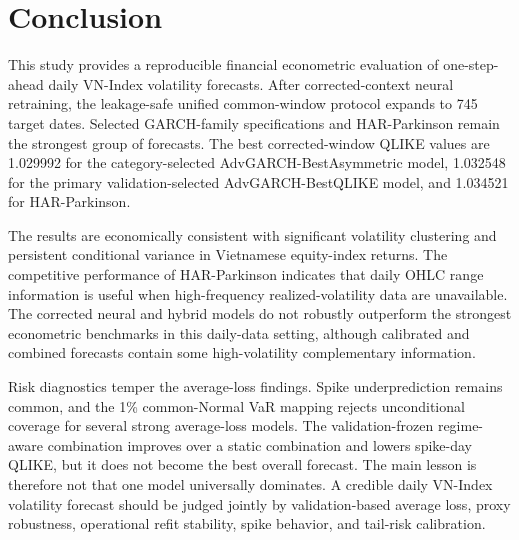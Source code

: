 \section{Conclusion}

This study provides a reproducible financial econometric evaluation of one-step-ahead daily VN-Index volatility forecasts. After corrected-context neural retraining, the leakage-safe unified common-window protocol expands to 745 target dates. Selected GARCH-family specifications and HAR-Parkinson remain the strongest group of forecasts. The best corrected-window QLIKE values are 1.029992 for the category-selected AdvGARCH-BestAsymmetric model, 1.032548 for the primary validation-selected AdvGARCH-BestQLIKE model, and 1.034521 for HAR-Parkinson.

The results are economically consistent with significant volatility clustering and persistent conditional variance in Vietnamese equity-index returns. The competitive performance of HAR-Parkinson indicates that daily OHLC range information is useful when high-frequency realized-volatility data are unavailable. The corrected neural and hybrid models do not robustly outperform the strongest econometric benchmarks in this daily-data setting, although calibrated and combined forecasts contain some high-volatility complementary information.

Risk diagnostics temper the average-loss findings. Spike underprediction remains common, and the 1\% common-Normal VaR mapping rejects unconditional coverage for several strong average-loss models. The validation-frozen regime-aware combination improves over a static combination and lowers spike-day QLIKE, but it does not become the best overall forecast. The main lesson is therefore not that one model universally dominates. A credible daily VN-Index volatility forecast should be judged jointly by validation-based average loss, proxy robustness, operational refit stability, spike behavior, and tail-risk calibration.
